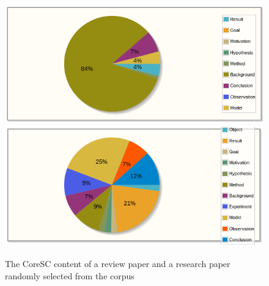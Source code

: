 \documentclass{svmult}
\begin{document}
\begin{figure}[t]
\sidecaption[t]
%
%
\centering
\includegraphics[width=\textwidth]{figures/review_corescs.png}
\includegraphics[width=\textwidth]{figures/report_corescs.png}
\caption{The CoreSC content of a review paper and a research paper randomly selected from the corpus}
\label{fig:coresc_pies} 
\end{figure}
\end{document}

